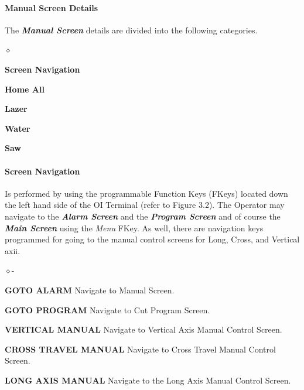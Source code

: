 \paragraph{Manual Screen Details}
The \textbf{\textit{Manual Screen}} details are divided into the following categories.
\begin{list}{$\diamond$}{}
	\item \textbf{Screen Navigation}
	\item \textbf{Home All}
	\item \textbf{Lazer}
	\item \textbf{Water}
	\item \textbf{Saw}
\end{list}
\paragraph*{Screen Navigation}Is performed by using the programmable Function Keys (FKeys) located down the left hand side of the OI Terminal (refer to Figure 3.2). The Operator may navigate to the \textbf{\textit{Alarm Screen}} and the \textbf{\textit{Program Screen}} and of course the \textbf{\textit{Main Screen}} using the \textit{Menu} FKey. As well, there are navigation keys programmed for going to the manual control screens for Long, Cross, and Vertical axii.
\begin{list}{$\diamond$-}{}
	\item \textbf{GOTO ALARM} Navigate to Manual Screen.
	\item \textbf{GOTO PROGRAM} Navigate to Cut Program Screen.
	\item \textbf{VERTICAL MANUAL} Navigate to Vertical Axis Manual Control Screen.
	\item \textbf{CROSS TRAVEL MANUAL} Navigate to Cross Travel Manual Control Screen.
	\item \textbf{LONG AXIS MANUAL} Navigate to the Long Axis Manual Control Screen.
\end{list}
